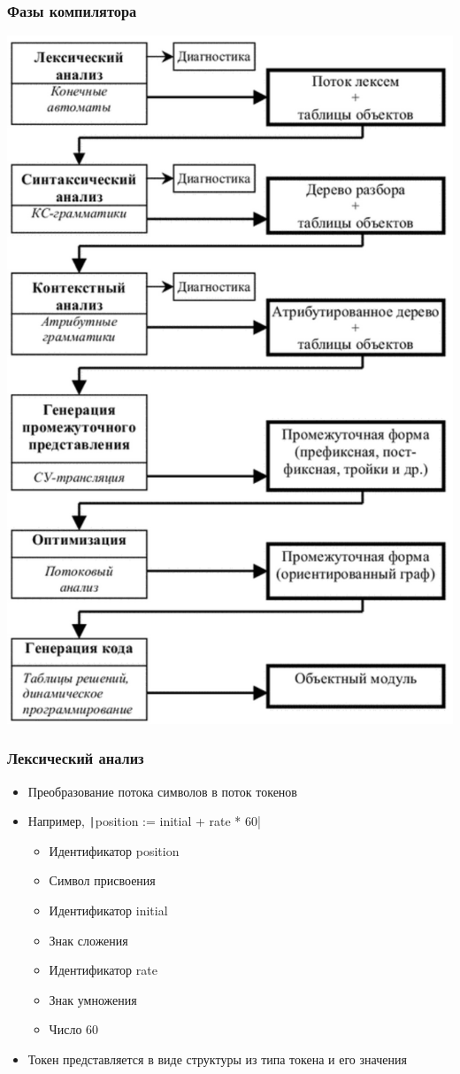 \documentclass[xetex,mathserif,serif]{beamer}
\begin{document}
	\begin{frame}
		\frametitle{Фазы компилятора}
		\begin{center}
			\includegraphics[height=0.8\textheight]{compilerPhases.png}
		\end{center}
	\end{frame}

	\begin{frame}
		\frametitle{Лексический анализ}
		\begin{itemize}
			\item Преобразование потока символов в поток токенов
			\item Например, \texttt|position := initial + rate * 60|
			\begin{itemize}
				\item Идентификатор position
				\item Символ присвоения
				\item Идентификатор initial
				\item Знак сложения
				\item Идентификатор rate
				\item Знак умножения
				\item Число 60
			\end{itemize}
			\item Токен представляется в виде структуры из типа токена и его значения
		\end{itemize}
	\end{frame}
\end{document}
